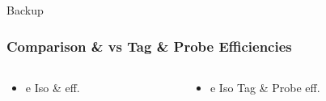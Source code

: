\documentclass{beamer}
\begin{document}
\begin{frame}
 \begin{block}{}
 \centering
 \Large Backup
 \end{block}
\end{frame}

\begin{frame}
 \frametitle{Comparison \ttbar \& \wpj vs Tag \& Probe Efficiencies}
  \begin{columns}

   \begin{column}{0.50\textwidth}
     \begin{itemize}
   \item e Iso \ttbar \& \wpj eff.
  \end{itemize}
   \end{column}
   \begin{column}{0.50\textwidth}
   \begin{itemize}
    \item e Iso Tag \& Probe eff.
   \end{itemize}


\end{column}
\end{columns}
\end{frame}
\end{document}
